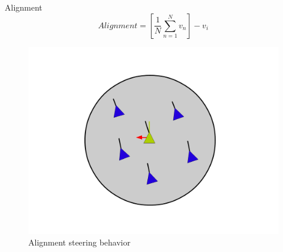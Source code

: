 \documentclass[red]{beamer}
\begin{document}
\begin{frame}{Alignment}
	\begin{equation}
	\label{alignmentEquation}
	Alignment = \left[  \frac{1}{N} \sum_{n=1}^{N} v_n \right ] - v_i
	\end{equation}
	
	\pause
	\begin{figure}[htbp]
	\begin{center}
	\includegraphics[scale=0.15]{../figures/alignment.pdf}
	\caption{Alignment steering behavior}
	\label{alignment}
	\end{center}
	\end{figure}
\end{frame}
\end{document}
